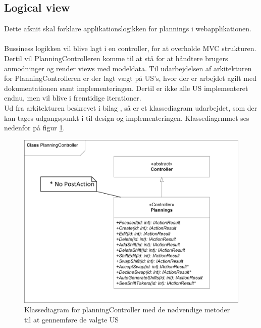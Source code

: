\subsection{Logical view}\label{ssec:planlaegning:logicalview}
Dette afsnit skal forklare applikationslogikken for plannings i webapplikationen.
\\ \\
Bussiness logikken vil blive lagt i en controller, for at overholde MVC strukturen. Dertil vil PlanningControlleren komme til at stå for at håndtere brugers anmodninger og render views med modeldata. Til udarbejdelsen af arkitekturen for PlanningControlleren er der lagt vægt på US's, hvor der er arbejdet agilt med dokumentationen samt implementeringen. Dertil er ikke alle US implementeret endnu, men vil blive i fremtidige iterationer. \\

\noindent Ud fra arkitekturen beskrevet i bilag \cite{ArkitekturPlanning}, så er et klassediagram udarbejdet, som der kan tages udgangspunkt i til design og implementeringen. Klassediagrmmet ses nedenfor på figur \ref{fig:ark_planning_logic_classdiagram}.

\begin{figure}[H]
  \includegraphics[scale=0.8]{09_Arkitektur/Planning/pictures/CD_Planning.jpg}
  \centering
  \caption{Klassediagram for planningController med de nødvendige metoder til at gennemføre de valgte US}
  \label{fig:ark_planning_logic_classdiagram}
\end{figure}

